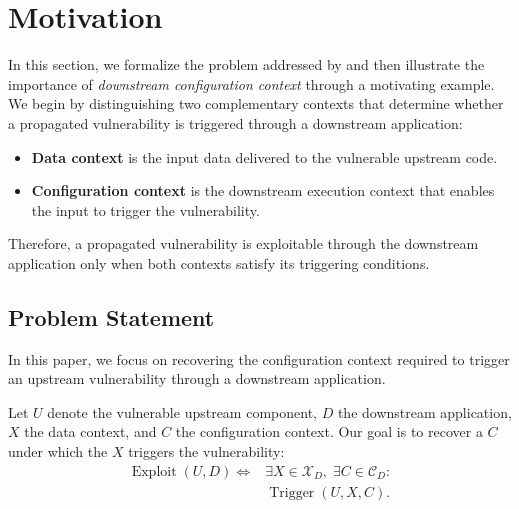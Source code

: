 \section{Motivation}\label{sec:moti}
In this section, we formalize the problem addressed by \sys and then illustrate the importance of \textit{downstream configuration context} through a motivating example.
We begin by distinguishing two complementary contexts that determine whether a propagated vulnerability is triggered through a downstream application:
\begin{itemize}
    \setlength\itemsep{0.0em}
    \item \textbf{Data context} is the input data delivered to the vulnerable upstream code.
    \item \textbf{Configuration context} is the downstream execution context that enables the input to trigger the vulnerability.
\end{itemize}
Therefore, a propagated vulnerability is exploitable through the downstream application only when both contexts satisfy its triggering conditions.

\subsection{Problem Statement}
\label{subsec:problem}
In this paper, we focus on recovering the configuration context required to trigger an upstream vulnerability through a downstream application.

Let \(U\) denote the vulnerable upstream component, \(D\) the downstream application, \(X\) the data context, and \(C\) the configuration context. 
Our goal is to recover a \(C\) under which the \(X\) triggers the vulnerability:
\[
\begin{aligned}
\operatorname{Exploit}(U,D)
\iff {} & \exists X \in \mathcal{X}_D,\;
           \exists C \in \mathcal{C}_D: \\
        & \operatorname{Trigger}(U,X,C).
\end{aligned}
\]

